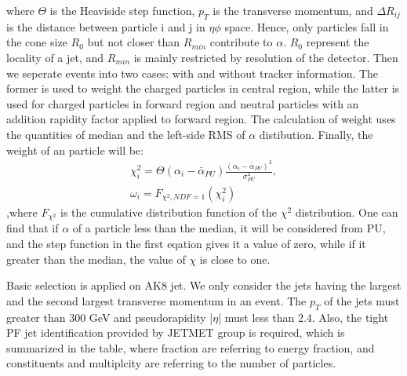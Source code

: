 where $\Theta$ is the Heaviside step function, $p_{T}$ is the transverse momentum, and $\Delta R_{ij}$ is the distance between particle i and j in $\eta \phi$ space. Hence, only particles fall in the cone size $R_0$ but not closer than $R_{min}$ contribute to $\alpha $. $R_0$ represent the locality of a jet, and $R_{min}$ is mainly restricted by resolution of the detector. Then we seperate events into two cases: with and without tracker information. The former is used to weight the charged particles in central region, while the latter is used for charged particles in forward region and neutral particles with an addition rapidity factor applied to forward region. The calculation of weight uses the quantities of median and the left-side RMS of $\alpha $ distibution. Finally, the weight of an particle will be: 
\begin{equation} \label{eq3}
\begin{split}
\chi ^2_{i} = \Theta(\alpha _i - \bar{\alpha } _{PU}) \frac{ ( \alpha _i - \bar{\alpha } _{PU})^2 }{\sigma ^2 _{PU}} , \\
\omega _i = F_{\chi ^2,NDF=1}(\chi ^2_i) 
\end{split}
\end{equation}
,where $F_{\chi ^2}$ is the cumulative distribution function of the $\chi ^2$ distribution. One can find that if $\alpha $ of a particle less than the median, it will be considered from PU, and the step function in the first eqation gives it a value of zero, while if it greater than the median, the value of $\chi $ is close to one. 

Basic selection is applied on AK8 jet. We only consider the jets having the largest and the second largest transverse momentum in an event. The $p_{T}$ of the jets must greater than 300 GeV and pseudorapidity |$\eta$| must less than 2.4. Also, the tight PF jet identification provided by JETMET group is required, which is summarized in the table, where fraction are referring to energy fraction, and constituents and multiplcity are referring to the number of particles.

